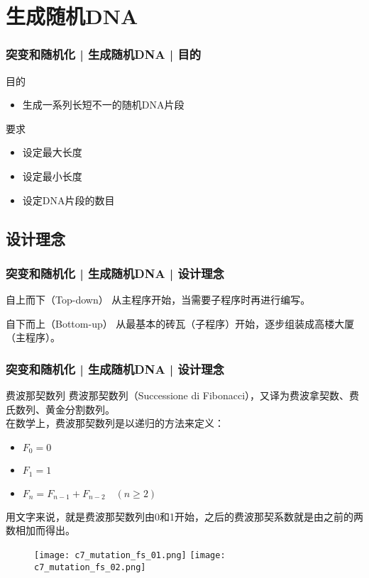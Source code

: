 \section{生成随机DNA}
\begin{frame}
  \frametitle{突变和随机化 | 生成随机DNA | 目的}
  \begin{block}{目的}
    \begin{itemize}
      \item 生成一系列长短不一的随机DNA片段
    \end{itemize}
  \end{block}
  \pause
  \begin{block}{要求}
    \begin{itemize}
      \item 设定最大长度
      \item 设定最小长度
      \item 设定DNA片段的数目
    \end{itemize}
  \end{block}
\end{frame}

\subsection{设计理念}
\begin{frame}
  \frametitle{突变和随机化 | 生成随机DNA | \alert{设计理念}}
  \begin{block}{自上而下（Top-down）}
    从主程序开始，当需要子程序时再进行编写。
  \end{block}
  \pause
  \begin{block}{自下而上（Bottom-up）}
    从最基本的砖瓦（子程序）开始，逐步组装成高楼大厦（主程序）。
  \end{block}
\end{frame}

\begin{frame}
  \frametitle{突变和随机化 | 生成随机DNA | 设计理念}
  \begin{block}{费波那契数列}
    费波那契数列（Successione di Fibonacci），又译为费波拿契数、费氏数列、黄金分割数列。\\
在数学上，费波那契数列是以递归的方法来定义：
\begin{itemize}
  \item $F_{0}=0$
  \item $F_{1}=1$
  \item $F_{n}=F_{{n-1}}+F_{{n-2}}\quad (n\geq 2)$
\end{itemize}
用文字来说，就是费波那契数列由0和1开始，之后的费波那契系数就是由之前的两数相加而得出。
  \end{block}
  \vspace{-0.5em}
  \begin{figure}
    \centering
    \texttt{[image: c7\_mutation\_fs\_01.png]}\quad
    \texttt{[image: c7\_mutation\_fs\_02.png]}
  \end{figure}
\end{frame}

